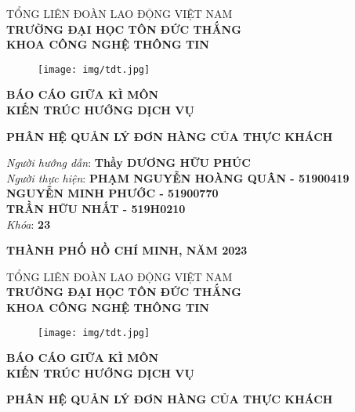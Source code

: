 \documentclass{report}
\begin{document}
\begin{center}
	\fontsize{14}{20}\selectfont
	\textsc{TỔNG LIÊN ĐOÀN LAO ĐỘNG VIỆT NAM\\ 
		\textbf{TRƯỜNG ĐẠI HỌC TÔN ĐỨC THẮNG\\} 
		\textbf{KHOA CÔNG NGHỆ THÔNG TIN}}
	
	\vspace{0.08cm}
	\begin{figure}[htp]
		\begin{center}
			\texttt{[image: img/tdt.jpg]}
		\end{center}
	\end{figure}
	
	\fontsize{15}{20}\selectfont\textbf{BÁO CÁO GIỮA KÌ MÔN\\ KIẾN TRÚC HƯỚNG DỊCH VỤ\\}
	
	\vspace{1.1cm}
	\fontsize{22}{20}\selectfont\textbf{PHÂN HỆ QUẢN LÝ ĐƠN HÀNG CỦA THỰC KHÁCH}
\end{center}
\vspace{2cm}
\begin{flushright}
	\fontsize{14}{20}\selectfont
	\textit{Người hướng dẫn}: \textbf{Thầy DƯƠNG HỮU PHÚC}\\
	
	\textit{Người thực hiện}:
	\textbf{PHẠM NGUYỄN HOÀNG QUÂN - 51900419}\\
	\textbf{NGUYỄN MINH PHƯỚC  - 51900770}\\
	\textbf{TRẦN HỮU NHẤT  - 519H0210}\\
	\textit{Khóa}: \textbf{23}\\
\end{flushright}
\vspace{4cm}
\begin{center}
	\fontsize{14}{20}\selectfont
	\textbf{THÀNH PHỐ HỒ CHÍ MINH, NĂM 2023}
\end{center}
\pagebreak
\begin{center}
	\fontsize{14}{20}\selectfont
	\textsc{TỔNG LIÊN ĐOÀN LAO ĐỘNG VIỆT NAM\\ 
		\textbf{TRƯỜNG ĐẠI HỌC TÔN ĐỨC THẮNG\\} 
		\textbf{KHOA CÔNG NGHỆ THÔNG TIN}}
	
	\vspace{0.08cm}
	\begin{figure}[htp]
		\begin{center}
			\texttt{[image: img/tdt.jpg]}
		\end{center}
	\end{figure}
	
	\fontsize{15}{20}\selectfont\textbf{BÁO CÁO GIỮA KÌ MÔN\\ KIẾN TRÚC HƯỚNG DỊCH VỤ\\}
	
	\vspace{1.1cm}
	\fontsize{22}{20}\selectfont\textbf{PHÂN HỆ QUẢN LÝ ĐƠN HÀNG CỦA THỰC KHÁCH}
\end{center}
\end{document}
